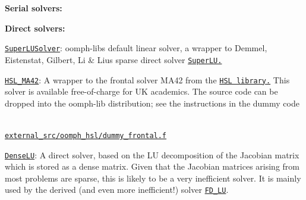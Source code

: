 \begin{DoxyItemize}
\item {\bfseries Serial solvers\+: } ~\newline
~\newline

\begin{DoxyItemize}
\item {\bfseries Direct solvers\+:} ~\newline
~\newline

\begin{DoxyItemize}
\item \href{../../the_data_structure/html/classoomph_1_1SuperLUSolver.html}{\tt {\ttfamily Super\+L\+U\+Solver}}\+: {\ttfamily oomph-\/lib\textquotesingle{}s} default linear solver, a wrapper to Demmel, Eistenstat, Gilbert, Li \& Liu\textquotesingle{}s sparse direct solver \href{http://crd.lbl.gov/~xiaoye/SuperLU}{\tt Super\+LU.} ~\newline
~\newline

\item \href{../../the_data_structure/html/classoomph_1_1HSL__MA42.html}{\tt {\ttfamily H\+S\+L\+\_\+\+M\+A42}}\+: A wrapper to the frontal solver M\+A42 from the \href{http://www.hsl.rl.ac.uk/}{\tt H\+SL library.} This solver is available free-\/of-\/charge for UK academics. The source code can be dropped into the {\ttfamily oomph-\/lib} distribution; see the instructions in the dummy code~\newline
~\newline
 \begin{center} \href{../../../external_src/oomph_hsl/dummy_frontal.f}{\tt external\+\_\+src/oomph\+\_\+hsl/dummy\+\_\+frontal.\+f}~\newline
~\newline
 \end{center} 
\item \href{../../the_data_structure/html/classoomph_1_1DenseLU.html}{\tt {\ttfamily Dense\+LU}}\+: A direct solver, based on the LU decomposition of the Jacobian matrix which is stored as a dense matrix. Given that the Jacobian matrices arising from most problems are sparse, this is likely to be a very inefficient solver. It is mainly used by the derived (and even more inefficient!) solver \href{../../the_data_structure/html/classoomph_1_1FD__LU.html}{\tt {\ttfamily F\+D\+\_\+\+LU}}.~\newline
~\newline


\end{DoxyItemize}
\end{DoxyItemize}
\end{DoxyItemize}
